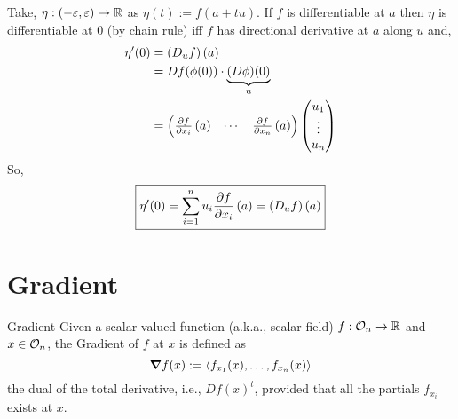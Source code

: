 \documentclass[../Analysis-3.tex]{subfiles}
\begin{document}
Take, $ \eta : \left( -\varepsilon, \varepsilon \right) \to \mathbb{R} $ as $ \eta(t) := f(a+tu) $. If $ f $ is differentiable at $ a $ then $ \eta $ is differentiable at 0 (by chain rule) iff $f$ has directional derivative at $ a $ along $ u $ and,
\begin{align*}
  \eta'(0) & = \left( D_uf \right)\left( a \right)                                 \\
           & = Df(\phi(0))\cdot \underbrace{(D\phi)(0)}_{u}                        \\
           & = \begin{pmatrix}
                 \pdv{f}{x_i}\left( a \right) & \cdots & \pdv{f}{x_n}\left( a \right)
               \end{pmatrix}\begin{pmatrix}
                              u_1 \\ \vdots \\ u_n \end{pmatrix}
\end{align*}
So,
\[
  \boxed{\eta'(0) = \sum_{i=1}^{n}u_i\pdv{f}{x_i} \left( a \right) = \left( D_uf \right)\left( a \right)}
\]



\section{Gradient}

\begin{Def}{Gradient}{}
  Given a scalar-valued function (a.k.a., scalar field) $ f:\mathcal{O}_{n}\to\mathbb{R} $ and $ x\in\mathcal{O}_{n} $, the Gradient of $ f $ at $ x $ is defined as
  \[
    \grad f(x) := \left\langle f_{x_1}(x), \ldots, f_{x_n}(x) \right\rangle
  \]
  the dual of the total derivative, i.e., $ Df(x)^t $, provided that all the partials $ f_{x_i} $ exists at $ x $.
\end{Def}
\end{document}
